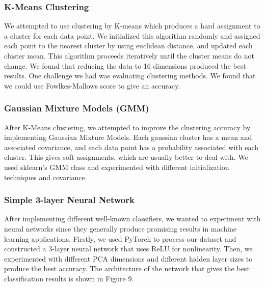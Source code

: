 \subsubsection{\textbf{K-Means Clustering}}
We attempted to use clustering by K-means which produces a hard assignment to a cluster for each data point. We initialized this algorithm randomly and assigned each point to the nearest cluster by using euclidean distance, and updated each cluster mean. This algorithm proceeds iteratively until the cluster means do not change. We found that reducing the data to 16 dimensions produced the best results. One challenge we had was evaluating clustering methods. We found that we could use Fowlkes-Mallows score to give an accuracy.

\subsubsection{\textbf{Gaussian Mixture Models (GMM)}}
After K-Means clustering, we attempted to improve the clustering accuracy by implementing Gaussian Mixture Models. Each gaussian cluster has a mean and associated covariance, and each data point has a probability associated with each cluster. This gives soft assignments, which are usually better to deal with. We used sklearn's GMM class and experimented with different initialization techniques and covariance. 

\subsubsection{\textbf{Simple 3-layer Neural Network}}
After implementing different well-known classifiers, we wanted to experiment with neural networks since they generally produce promising results in machine learning applications. Firstly, we used PyTorch to process our dataset and constructed a 3-layer neural network that uses ReLU for nonlinearity. Then, we experimented with different PCA dimensions and different hidden layer sizes to produce the best accuracy. The architecture of the network that gives the best classification results is shown in Figure 9. 

